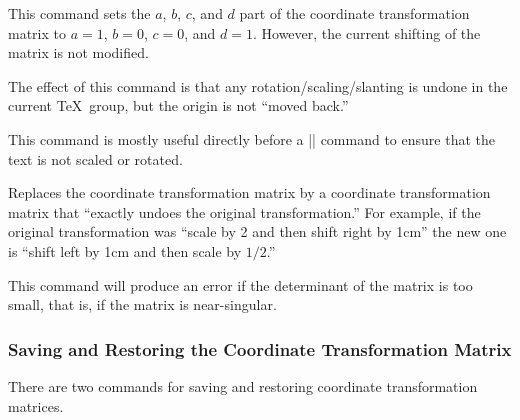\begin{command}{\pgftransformresetnontranslations}
  This command sets the $a$, $b$, $c$, and $d$ part of the coordinate
  transformation matrix to $a=1$, $b=0$, $c=0$, and $d=1$. However,
  the current shifting of the matrix is not modified.

  The effect of this command is that any rotation/scaling/slanting is
  undone in the current \TeX\ group, but the origin is not ``moved
  back.''

  This command is mostly useful directly before a |\pgftext| command
  to ensure that the text is not scaled or rotated.
\begin{codeexample}[]
\end{codeexample}
\end{command}


\begin{command}{\pgftransforminvert}
  Replaces the coordinate transformation matrix by a coordinate
  transformation matrix that ``exactly undoes the original
  transformation.'' For example, if the original transformation was
  ``scale by 2 and then shift right by 1cm'' the new one is ``shift
  left by 1cm and then scale by $1/2$.''

  This command will produce an error if the determinant of
  the matrix is too small, that is, if the matrix is near-singular.
\begin{codeexample}[]
\end{codeexample}
\end{command}



\subsubsection{Saving and Restoring the Coordinate Transformation
  Matrix}

There are two commands for saving and restoring coordinate
transformation matrices.

